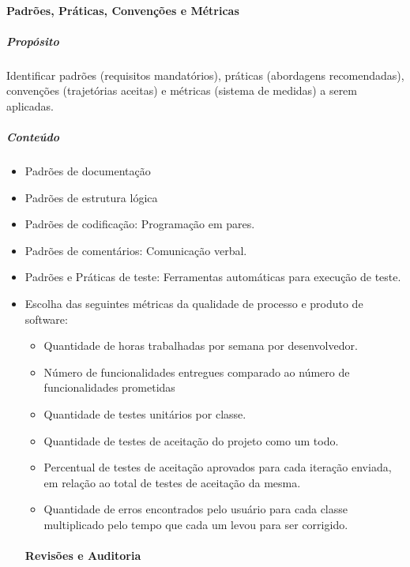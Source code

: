 \paragraph{Padrões, Práticas, Convenções e Métricas}

\subparagraph{Propósito}

Identificar padrões (requisitos mandatórios), práticas (abordagens recomendadas), convenções (trajetórias aceitas) e métricas (sistema de medidas) a serem aplicadas.

\subparagraph{Conteúdo} 

\begin{itemize}
\item Padrões de documentação

\item Padrões de estrutura lógica

\item Padrões de codificação: Programação em pares.

\item Padrões de comentários: Comunicação verbal.

\item Padrões e Práticas de teste: Ferramentas automáticas para execução de teste.

\item Escolha das seguintes métricas da qualidade de processo e produto de software:
   \begin{itemize}
  \item Quantidade de horas trabalhadas por semana por desenvolvedor.
  \item Número de funcionalidades entregues comparado ao número de funcionalidades prometidas

    \item Quantidade de testes unitários por classe.

    \item Quantidade de testes de aceitação do projeto como um todo.

    \item Percentual de testes de aceitação aprovados para cada iteração enviada, em relação ao total de testes de aceitação da mesma.

    \item Quantidade de erros encontrados pelo usuário para cada classe multiplicado pelo tempo que cada um levou para ser corrigido.
  \end{itemize}
  
\paragraph{Revisões e Auditoria}


\end{itemize}
